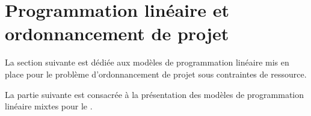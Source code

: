 \chapter{Programmation linéaire et ordonnancement
  de projet}



La section suivante est dédiée aux modèles de programmation linéaire
mis en place pour le problème d'ordonnancement de projet sous
contraintes de ressource. 



La partie suivante est consacrée à la présentation des modèles de
programmation linéaire mixtes pour le \CECSP.